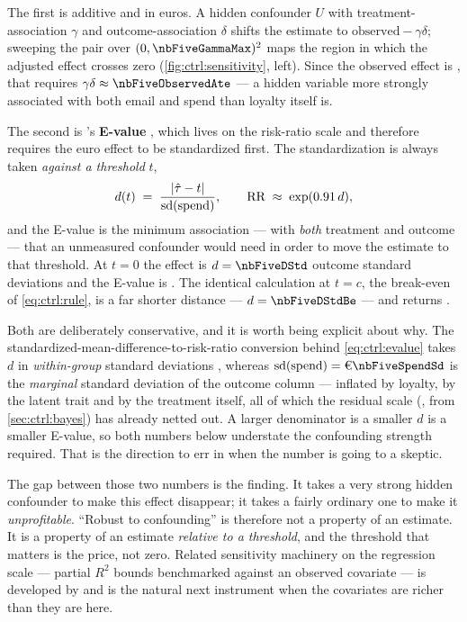 The first is additive and in euros. A hidden confounder $U$ with treatment-association $\gamma$
and outcome-association $\delta$ shifts the estimate to
$\text{observed} - \gamma\delta$; sweeping the pair over $(0, \nbFiveGammaMax)^2$ maps the region
in which the adjusted effect crosses zero (\cref{fig:ctrl:sensitivity}, left). Since the observed
effect is \eur{\nbFiveObservedAte}, that requires $\gamma\delta \approx \nbFiveObservedAte$ ---
a hidden variable more strongly associated with both email and spend than loyalty itself is.

The second is \citeauthor{vanderweele2017}'s \textbf{E-value} \citep{vanderweele2017}, which
lives on the risk-ratio scale and therefore requires the euro effect to be standardized first.
The standardization is always taken \emph{against a threshold} $t$,
%
\begin{equation}
  d(t) \;=\; \frac{|\hat\tau - t|}{\operatorname{sd}(\text{spend})},
  \qquad \text{RR} \;\approx\; \exp(0.91\,d),
  \label{eq:ctrl:evalue}
\end{equation}
%
and the E-value is the minimum association --- with \emph{both} treatment and outcome --- that an
unmeasured confounder would need in order to move the estimate to that threshold. At $t = 0$ the
effect is $d = \nbFiveDStd$ outcome standard deviations and the E-value is \nbFiveEValue. The
identical calculation at $t = c$, the break-even of \cref{eq:ctrl:rule}, is a far shorter
distance --- $d = \nbFiveDStdBe$ --- and returns \nbFiveEValueBe.

Both are deliberately conservative, and it is worth being explicit about why. The
standardized-mean-difference-to-risk-ratio conversion behind \cref{eq:ctrl:evalue} takes $d$ in
\emph{within-group} standard deviations \citep{vanderweele2017}, whereas $\sd(\text{spend}) = \eur{\nbFiveSpendSd}$ is the \emph{marginal}
standard deviation of the outcome column --- inflated by loyalty, by the latent trait and by the
treatment itself, all of which the residual scale (\eur{\nbFiveSigmaPost}, from
\cref{sec:ctrl:bayes}) has already netted out. A larger denominator is a smaller $d$ is a smaller
E-value, so both numbers below understate the confounding strength required. That is the direction
to err in when the number is going to a skeptic.



The gap between those two numbers is the finding. It takes a very strong hidden confounder to
make this effect disappear; it takes a fairly ordinary one to make it \emph{unprofitable}.
``Robust to confounding'' is therefore not a property of an estimate. It is a property of an
estimate \emph{relative to a threshold}, and the threshold that matters is the price, not zero. Related sensitivity machinery on the regression scale ---
partial $R^2$ bounds benchmarked against an observed covariate --- is developed by
\citet{cinelli2020} and is the natural next instrument when the covariates are richer than they
are here.

